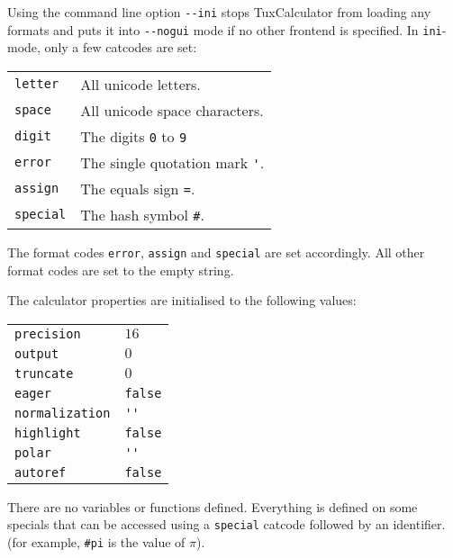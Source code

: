 \documentclass[10pt]{article}
\begin{document}
    Using the command line option \verb|--ini| stops TuxCalculator from loading any formats and puts it into \verb|--nogui| mode if no other frontend is specified.
    In \texttt{ini}-mode, only a few catcodes are set:
    \begin{center}
        \begin{tabular}{p{}p{}}
            \verb|letter|  & All unicode letters.                \\
            \verb|space|   & All unicode space characters.       \\
            \verb|digit|   & The digits \verb|0| to \verb|9|     \\
            \verb|error|   & The single quotation mark \verb|'|. \\
            \verb|assign|  & The equals sign \verb|=|.           \\
            \verb|special| & The hash symbol \verb|#|.           \\
        \end{tabular}
    \end{center}
    The format codes \verb|error|, \verb|assign| and \verb|special| are set accordingly.
    All other format codes are set to the empty string.
    
    The calculator properties are initialised to the following values:
    \begin{center}
        \begin{tabular}{p{}p{}}
            \verb|precision|     & $ 16 $       \\
            \verb|output|        & $ 0 $        \\
            \verb|truncate|      & $ 0 $        \\
            \verb|eager|         & \verb|false| \\
            \verb|normalization| & \verb|''|    \\
            \verb|highlight|     & \verb|false| \\
            \verb|polar|         & \verb|''|    \\
            \verb|autoref|       & \verb|false| \\
        \end{tabular}
    \end{center}
    
    There are no variables or functions defined.
    Everything is defined on some specials that can be accessed using a \verb|special| catcode followed by an identifier.
    (for example, \verb|#pi| is the value of $ \pi $).
    
\end{document}
